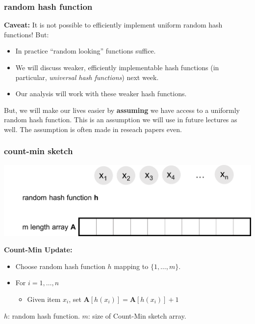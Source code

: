 \documentclass[]{beamer}
\newcommand{\bv}[1]{\mathbf{#1}}
\begin{document}
	\begin{frame}
		\frametitle{random hash function}
		\textbf{Caveat:}
		It is not possible to efficiently implement uniform random hash functions! But:
		\begin{itemize}
			\item In practice ``random looking'' functions suffice.
			\item We will discuss weaker, efficiently implementable hash functions (in particular, \emph{universal hash functions}) next week.
			\item Our analysis will work with these weaker hash functions.
		\end{itemize}	
		But, we will make our lives easier by \textbf{assuming} we have access to a uniformly random hash function. This is an assumption we will use in future lectures as well. The assumption is often made in reseach papers even. 
	\end{frame}
	
	
	
	\begin{frame}
		\frametitle{count-min sketch}
		\includegraphics[width=.85\textwidth]{cm0.png}
		
		\textbf{Count-Min Update:}
		\begin{itemize}
			\item Choose random hash function $h$ mapping to $\{1, \ldots, m\}$.
			\item For $i = 1, \ldots, n$
			\begin{itemize}
				\item Given item $x_i$, set $\bv{A}[h(x_i)] = \bv{A}[h(x_i)] + 1$
			\end{itemize}
		\end{itemize}
		
		
		\vspace{3em}
		\begin{block}{\vspace*{-3ex}}
			${h}$: random hash function. $m$: size of Count-Min sketch array.
		\end{block}
	\end{frame}
	
\end{document}
